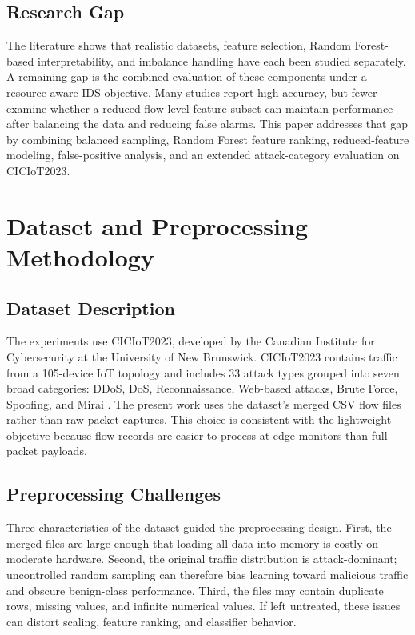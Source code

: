 \documentclass[journal]{IEEEtran}
\begin{document}
\subsection{Research Gap}
The literature shows that realistic datasets, feature selection, Random Forest-based interpretability, and imbalance handling have each been studied separately. A remaining gap is the combined evaluation of these components under a resource-aware IDS objective. Many studies report high accuracy, but fewer examine whether a reduced flow-level feature subset can maintain performance after balancing the data and reducing false alarms. This paper addresses that gap by combining balanced sampling, Random Forest feature ranking, reduced-feature modeling, false-positive analysis, and an extended attack-category evaluation on CICIoT2023.


\section{Dataset and Preprocessing Methodology}
\label{sec:dataset_preprocessing}

\subsection{Dataset Description}
The experiments use CICIoT2023, developed by the Canadian Institute for Cybersecurity at the University of New Brunswick. CICIoT2023 contains traffic from a 105-device IoT topology and includes 33 attack types grouped into seven broad categories: DDoS, DoS, Reconnaissance, Web-based attacks, Brute Force, Spoofing, and Mirai \cite{neto2023ciciot}. The present work uses the dataset's merged CSV flow files rather than raw packet captures. This choice is consistent with the lightweight objective because flow records are easier to process at edge monitors than full packet payloads.

\subsection{Preprocessing Challenges}
Three characteristics of the dataset guided the preprocessing design. First, the merged files are large enough that loading all data into memory is costly on moderate hardware. Second, the original traffic distribution is attack-dominant; uncontrolled random sampling can therefore bias learning toward malicious traffic and obscure benign-class performance. Third, the files may contain duplicate rows, missing values, and infinite numerical values. If left untreated, these issues can distort scaling, feature ranking, and classifier behavior.
\end{document}
